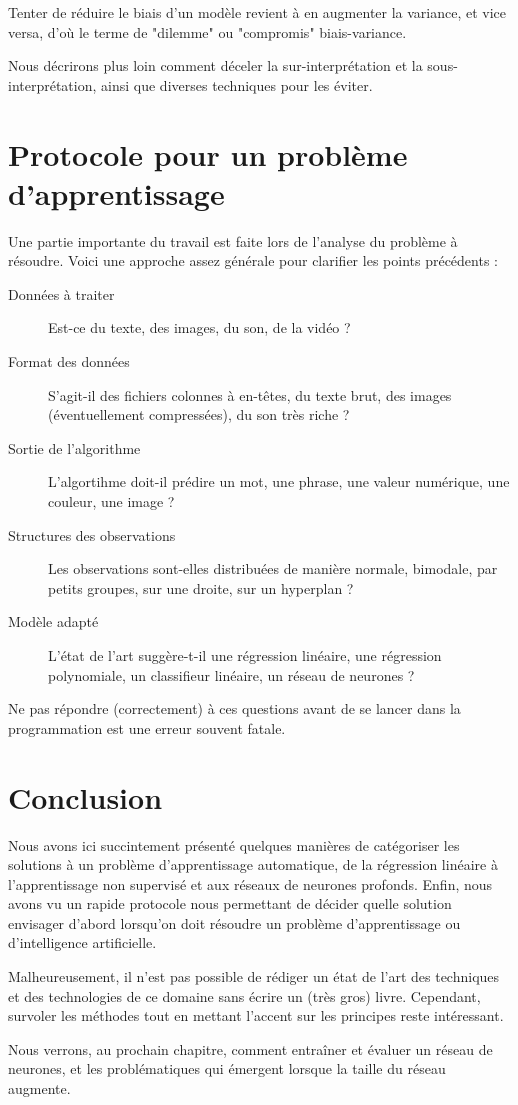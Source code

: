 Tenter de réduire le biais d'un modèle revient à en augmenter la variance, et vice versa, d'où le terme de "dilemme" ou "compromis" biais-variance.

Nous décrirons plus loin comment déceler la sur-interprétation et la sous-interprétation, ainsi que diverses techniques pour les éviter.

\section{Protocole pour un problème d'apprentissage}
Une partie importante du travail est faite lors de l'analyse du problème à résoudre. Voici une approche assez générale pour clarifier les points précédents :

\begin{description}
\item [Données à traiter] Est-ce du texte, des images, du son, de la vidéo ?
\item [Format des données] S'agit-il des fichiers colonnes à en-têtes, du texte brut, des images (éventuellement compressées), du son très riche ?
\item [Sortie de l'algorithme] L'algortihme doit-il prédire un mot, une phrase, une valeur numérique, une couleur, une image ?
\item [Structures des observations] Les observations sont-elles distribuées de manière normale, bimodale, par petits groupes, sur une droite, sur un hyperplan ? 
\item [Modèle adapté] L'état de l'art suggère-t-il une régression linéaire, une régression polynomiale, un classifieur linéaire, un réseau de neurones ?
\end{description}

Ne pas répondre (correctement) à ces questions avant de se lancer dans la programmation est une erreur souvent fatale.

\section{Conclusion}
Nous avons ici succintement présenté quelques manières de catégoriser les solutions à un problème d'apprentissage automatique, de la régression linéaire à l'apprentissage non supervisé et aux réseaux de neurones profonds. Enfin, nous avons vu un rapide protocole nous permettant de décider quelle solution envisager d'abord lorsqu'on doit résoudre un problème d'apprentissage ou d'intelligence artificielle.

Malheureusement, il n'est pas possible de rédiger un état de l'art des techniques et des technologies de ce domaine sans écrire un (très gros) livre. Cependant, survoler les méthodes tout en mettant l'accent sur les principes reste intéressant.

Nous verrons, au prochain chapitre, comment entraîner et évaluer un réseau de neurones, et les problématiques qui émergent lorsque la taille du réseau augmente.